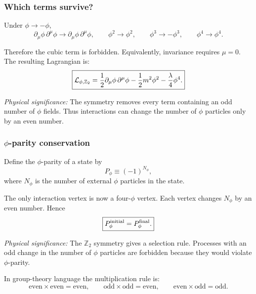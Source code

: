 \documentclass[../main.tex]{subfiles}
\begin{document}
\subsubsection*{Which terms survive?}

Under $\phi\to-\phi$,
\begin{equation}
  \partial_\mu\phi\,\partial^\mu\phi\to
  \partial_\mu\phi\,\partial^\mu\phi,
  \qquad
  \phi^2\to\phi^2,
  \qquad
  \phi^3\to-\phi^3,
  \qquad
  \phi^4\to\phi^4.
  \label{eq:lec09:z2-term-transformations}
\end{equation}

Therefore the cubic term is forbidden.  Equivalently, invariance requires $\mu=0$.  The resulting Lagrangian is:
\begin{equation}
  \boxed{
  \mathcal{L}_{\phi,\mathbb{Z}_2}
  =
  \frac{1}{2}\partial_\mu\phi\,\partial^\mu\phi
  -\frac{1}{2}m^2\phi^2
  -\frac{\lambda}{4}\phi^4.}
  \label{eq:lec09:z2-lagrangian}
\end{equation}

\textit{Physical significance:} The symmetry removes every term containing an odd number of $\phi$ fields.  Thus interactions can change the number of $\phi$ particles only by an even number.

\subsubsection*{$\phi$-parity conservation}

Define the $\phi$-parity of a state by
\begin{equation}
  \boxed{
  P_\phi \equiv (-1)^{N_\phi},}
  \label{eq:lec09:phi-parity}
\end{equation}
where $N_\phi$ is the number of external $\phi$ particles in the state.

The only interaction vertex is now a four-$\phi$ vertex.  Each vertex changes $N_\phi$ by an even number.  Hence
\begin{equation}
  \boxed{
  P_\phi^{\rm initial}=P_\phi^{\rm final}.}
  \label{eq:lec09:phi-parity-conservation}
\end{equation}

\textit{Physical significance:} The $\mathbb{Z}_2$ symmetry gives a selection rule.  Processes with an odd change in the number of $\phi$ particles are forbidden because they would violate $\phi$-parity.

In group-theory language the multiplication rule is:
\begin{equation}
  \boxed{
  \text{even}\times\text{even}=\text{even},
  \qquad
  \text{odd}\times\text{odd}=\text{even},
  \qquad
  \text{even}\times\text{odd}=\text{odd}.}
  \label{eq:lec09:z2-multiplication}
\end{equation}
\end{document}
